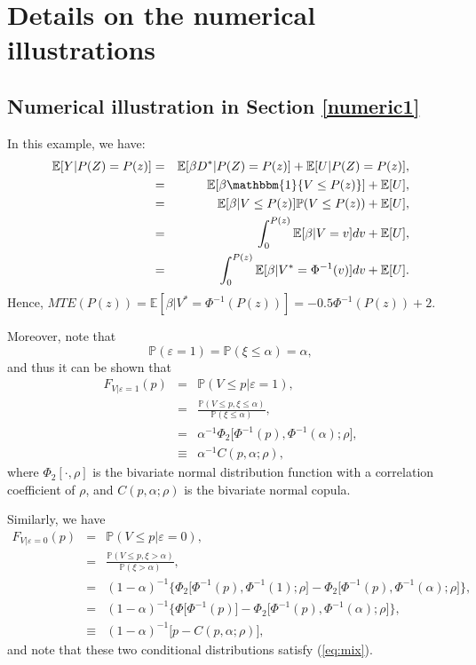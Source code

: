 \documentclass[11pt,reqno]{amsart}
\theoremstyle{plain}
\numberwithin{equation}{section}
\begin{document}
\section{Details on the numerical illustrations}
\subsection{Numerical illustration in Section \ref{numeric1}}\label{numeric:apx1}
In this example, we have:
\begin{eqnarray*}
\mathbb E[Y\vert P(Z)=P(z)] &=& \mathbb E[\beta D^* \vert P(Z)=P(z)]+\mathbb E[U \vert P(Z)=P(z)],\\
&=& \mathbb E[\beta \mathbbm{1}\{V\leq P(z)\}]+\mathbb E[U],\\
&=& \mathbb E[\beta \vert V\leq P(z)] \mathbb P(V\leq P(z))+\mathbb E[U],\\
&=& \int^{P(z)}_{0} \mathbb E[\beta \vert V=v] dv+\mathbb E[U],\\
&=& \int^{P(z)}_{0} \mathbb E[\beta \vert V^*=\Phi^{-1}(v)] dv+\mathbb E[U].
\end{eqnarray*}
Hence, $MTE(P(z))=\mathbb E\left [\beta\vert V^*=\Phi^{-1}(P(z))\right]=-0.5 \Phi^{-1}(P(z))+2$.

Moreover, note that
\begin{equation*}
    \mathbb P(\varepsilon = 1) = \mathbb P(\xi \leq \alpha) = \alpha,
\end{equation*} 
and thus it can be shown that
\begin{eqnarray*}
F_{V \vert \varepsilon=1}(p) &=& \mathbb P(V \leq p  \vert  \varepsilon = 1), \\
&=& \frac{\mathbb P(V \leq p, \xi \leq \alpha)}{\mathbb P (\xi \leq \alpha)}, \\
&=& \alpha ^{-1} \Phi_2 \big[ \Phi^{-1}(p), \Phi^{-1}(\alpha); \rho \big], \\
&\equiv& \alpha ^{-1} C(p, \alpha; \rho),
\end{eqnarray*}
where $\Phi_2 [\cdot, \rho]$ is the bivariate normal distribution function with a correlation coefficient of $\rho$, and $C(p, \alpha; \rho)$ is the bivariate normal copula.

Similarly, we have
\begin{eqnarray*}
F_{V \vert \varepsilon=0}(p) &=& \mathbb P(V \leq p  \vert  \varepsilon = 0), \\
&=& \frac{\mathbb P(V \leq p, \xi > \alpha)}{\mathbb P(\xi > \alpha)}, \\
&=& (1-\alpha) ^{-1} \Big\{ \Phi_2 \big[ \Phi^{-1}(p), \Phi^{-1}(1); \rho \big] - \Phi_2 \big[ \Phi^{-1}(p), \Phi^{-1}(\alpha); \rho \big] \Big\}, \\
&=& (1-\alpha) ^{-1} \Big\{ \Phi \big[ \Phi^{-1}(p) \big] - \Phi_2 \big[ \Phi^{-1}(p), \Phi^{-1}(\alpha); \rho \big] \Big\}, \\
&\equiv& (1-\alpha) ^{-1} \big[ p - C(p, \alpha; \rho) \big],
\end{eqnarray*}
and note that these two conditional distributions satisfy (\ref{eq:mix}).
\end{document}
